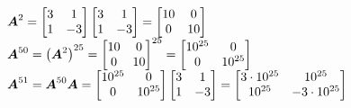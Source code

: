 \documentclass{ctexart}
\begin{document}
\begin{problem}\

\begin{equation*}
    \begin{array}{lll}
        \boldsymbol{A}^2=\begin{bmatrix}3&1\\1&-3\end{bmatrix}\begin{bmatrix}3&1\\1&-3\end{bmatrix}=\begin{bmatrix}10&0\\0&10\end{bmatrix}      \\
        \boldsymbol{A}^{50}=\left( \boldsymbol{A}^2 \right)^{25}={\begin{bmatrix}10&0\\0&10\end{bmatrix}}^{25}=\begin{bmatrix}10^{25}&0\\0&10^{25}\end{bmatrix} \\
        \boldsymbol{A}^{51}=\boldsymbol{A}^{50}\boldsymbol{A}=\begin{bmatrix}10^{25}&0\\0&10^{25}\end{bmatrix}\begin{bmatrix}3&1\\1&-3\end{bmatrix}=\begin{bmatrix}3\cdot10^{25}&10^{25}\\10^{25}&-3\cdot10^{25}\end{bmatrix}
    \end{array}
\end{equation*}
\end{problem}
\end{document}
